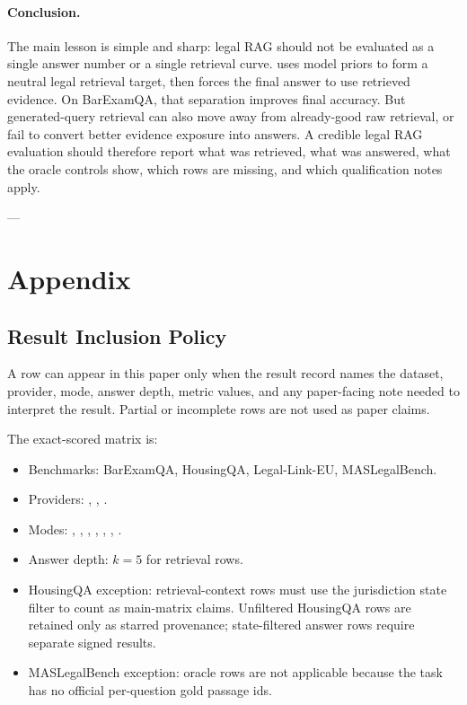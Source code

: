 \paragraph{Conclusion.}
The main lesson is simple and sharp: legal RAG should not be evaluated as a
single answer number or a single retrieval curve. \hyre{} uses model priors to
form a neutral legal retrieval target, then forces the final answer to use
retrieved evidence. On BarExamQA, that separation improves final accuracy. But
generated-query retrieval can also move away from already-good raw retrieval,
or fail to convert better evidence exposure into answers. A credible legal RAG
evaluation should therefore report what was retrieved, what was answered, what
the oracle controls show, which rows are missing, and which qualification notes
apply.

---
\section{Appendix}\label{sec:appendix}

\subsection{Result Inclusion Policy}

A row can appear in this paper only when the result record names the dataset,
provider, mode, answer depth, metric values, and any paper-facing note needed
to interpret the result. Partial or incomplete rows are not used as paper
claims.

The exact-scored matrix is:

\begin{itemize}[leftmargin=*]
\item Benchmarks: BarExamQA, HousingQA, Legal-Link-EU, MASLegalBench.
\item Providers: , ,
.
\item Modes: , , ,
, , ,
.
\item Answer depth: $k=5$ for retrieval rows.
\item HousingQA exception: retrieval-context rows must use the jurisdiction
state filter to count as main-matrix claims. Unfiltered HousingQA rows are
retained only as starred provenance; state-filtered answer rows require
separate signed results.
\item MASLegalBench exception: oracle rows are not applicable because the task
has no official per-question gold passage ids.
\end{itemize}

